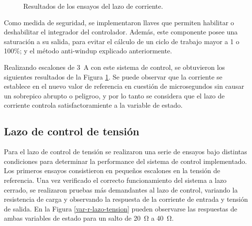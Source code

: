 \begin{figure}[hbt!]
  \centering
  \caption{Resultados de los ensayos del lazo de corriente.}
  \label{escalones-lazo-corriente}
\end{figure}

Como medida de seguridad, se implementaron llaves que permiten habilitar o deshabilitar el integrador del controlador. Además, este componente posee una saturación a su salida, para evitar el cálculo de un ciclo de trabajo mayor a 1 o 100\%; y el método anti-windup explicado anteriormente.

Realizando escalones de \SI{3}{\ampere} con este sistema de control, se obtuvieron los siguientes resultados de la Figura \ref{escalones-lazo-corriente}. Se puede observar que la corriente se establece en el nuevo valor de referencia en cuestión de microsegundos sin causar un sobrepico abrupto o peligroo, y por lo tanto se considera que el lazo de corriente controla satisfactoramiente a la variable de estado.

\subsection{Lazo de control de tensión}

Para el lazo de control de tensión se realizaron una serie de ensayos bajo distintas condiciones para determinar la performance del sistema de control implementado. Los primeros ensayos consistieron en pequeños escalones en la tensión de referencia. Una vez verificado el correcto funcionamiento del sistema a lazo cerrado, se realizaron pruebas más demandantes al lazo de control, variando la resistencia de carga y observando la respuesta de la corriente de entrada y tensión de salida. En la Figura \ref{var-r-lazo-tension} pueden observarse las respuestas de ambas variables de estado para un salto de \SI{20}{\ohm} a \SI{40}{\ohm}.

